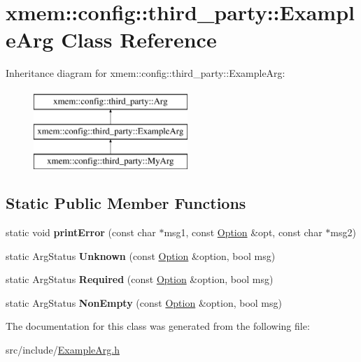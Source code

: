 \hypertarget{classxmem_1_1config_1_1third__party_1_1_example_arg}{\section{xmem\-:\-:config\-:\-:third\-\_\-party\-:\-:Example\-Arg Class Reference}
\label{classxmem_1_1config_1_1third__party_1_1_example_arg}
}
Inheritance diagram for xmem\-:\-:config\-:\-:third\-\_\-party\-:\-:Example\-Arg\-:\begin{figure}[H]
\begin{center}
\leavevmode
\includegraphics[height=3.000000cm]{classxmem_1_1config_1_1third__party_1_1_example_arg}
\end{center}
\end{figure}
\subsection*{Static Public Member Functions}
\begin{DoxyCompactItemize}
\item 
\hypertarget{classxmem_1_1config_1_1third__party_1_1_example_arg_a6121fd77d3727bb02ccd4438256beda0}{static void {\bfseries print\-Error} (const char $\ast$msg1, const \hyperlink{classxmem_1_1config_1_1third__party_1_1_option}{Option} \&opt, const char $\ast$msg2)}\label{classxmem_1_1config_1_1third__party_1_1_example_arg_a6121fd77d3727bb02ccd4438256beda0}

\item 
\hypertarget{classxmem_1_1config_1_1third__party_1_1_example_arg_a62f8121cadd8dfee722a1649caaa878c}{static Arg\-Status {\bfseries Unknown} (const \hyperlink{classxmem_1_1config_1_1third__party_1_1_option}{Option} \&option, bool msg)}\label{classxmem_1_1config_1_1third__party_1_1_example_arg_a62f8121cadd8dfee722a1649caaa878c}

\item 
\hypertarget{classxmem_1_1config_1_1third__party_1_1_example_arg_a9c71f36051376cdfbb807049a92921cf}{static Arg\-Status {\bfseries Required} (const \hyperlink{classxmem_1_1config_1_1third__party_1_1_option}{Option} \&option, bool msg)}\label{classxmem_1_1config_1_1third__party_1_1_example_arg_a9c71f36051376cdfbb807049a92921cf}

\item 
\hypertarget{classxmem_1_1config_1_1third__party_1_1_example_arg_ae641da2aeb27824f7a26b6859ba75dd3}{static Arg\-Status {\bfseries Non\-Empty} (const \hyperlink{classxmem_1_1config_1_1third__party_1_1_option}{Option} \&option, bool msg)}\label{classxmem_1_1config_1_1third__party_1_1_example_arg_ae641da2aeb27824f7a26b6859ba75dd3}

\end{DoxyCompactItemize}


The documentation for this class was generated from the following file\-:\begin{DoxyCompactItemize}
\item 
src/include/\hyperlink{_example_arg_8h}{Example\-Arg.\-h}\end{DoxyCompactItemize}
